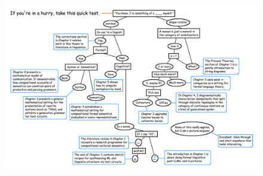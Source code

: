 


\thispagestyle{empty}%
\maketitle%

\clearpage

\begin{figure}
    \centering
    \includegraphics[width=1.5\linewidth]{figures/thesismap1.png}
\end{figure}
\clearpage

\tableofcontents


